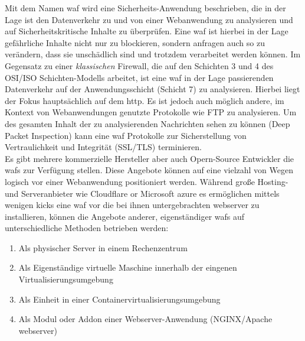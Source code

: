 \label{chap:waf-theory}

Mit dem Namen \ac{waf} wird eine Sicherheits-Anwendung beschrieben, die in der Lage ist den Datenverkehr zu und von einer Webanwendung zu analysieren und auf Sicherheitskritische Inhalte zu überprüfen. 
Eine \ac{waf} ist hierbei in der Lage gefährliche Inhalte nicht nur zu blockieren, sondern anfragen auch so zu verändern, dass sie unschädlich sind und trotzdem verarbeitet werden können.
Im Gegensatz zu einer \textit{klassischen} Firewall, die auf den Schichten 3 und 4 des OSI/ISO Schichten-Modells arbeitet, ist eine \ac{waf} in der Lage passierenden Datenverkehr auf der Anwendungsschicht (Schicht 7) zu analysieren. 
Hierbei liegt der Fokus hauptsächlich auf dem \ac{http}. Es ist jedoch auch möglich andere, im Kontext von Webanwendungen genutzte Protokolle wie FTP zu analysieren.
Um des gesamten Inhalt der zu analysierenden Nachrichten sehen zu können (Deep Packet Inspection) kann eine \ac{waf} Protokolle zur Sicherstellung von Vertraulichkeit und Integrität (SSL/TLS) terminieren.
\\
Es gibt mehrere kommerzielle Hersteller aber auch Opern-Source Entwickler die \acp{waf} zur Verfügung stellen.
Diese Angebote können auf eine vielzahl von Wegen logisch vor einer Webanwendung positioniert werden.
Während große Hosting- und Serveranbieter wie Cloudflare or Microsoft azure es ermöglichen mittels wenigen kicks eine \ac{waf} vor die bei ihnen untergebrachten webserver zu installieren, können die Angebote anderer, eigenständiger \acp{waf} auf unterschiedliche Methoden betrieben werden:
\begin{enumerate}
     \item Als physischer Server in einem Rechenzentrum
     \item Als Eigenständige virtuelle Maschine innerhalb der eingenen Virtualisierungsumgebung
     \item Als Einheit in einer Containervirtualisierungsumgebung
     \item Als Modul oder Addon einer Webserver-Anwendung (NGINX/Apache webserver)
\end{enumerate}

